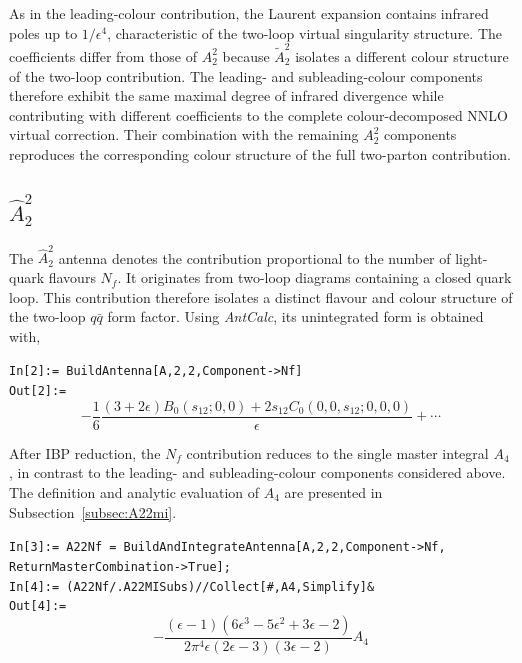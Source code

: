 As in the leading-colour contribution, the Laurent expansion contains infrared poles up to
$1/\epsilon^4$, characteristic of the two-loop virtual singularity structure. The coefficients differ
from those of $A_2^2$ because $\tilde A_2^2$ isolates a different colour structure of the two-loop
contribution. The leading- and subleading-colour components therefore exhibit the same maximal degree
of infrared divergence while contributing with different coefficients to the complete colour-decomposed
NNLO virtual correction. Their combination with the remaining $A_2^2$ components reproduces the
corresponding colour structure of the full two-parton contribution.

\subsection{$\hat A_2^2$}

The $\hat A_2^2$ antenna denotes the contribution proportional to the number of light-quark flavours
$N_f$. It originates from two-loop diagrams containing a closed quark loop.
This contribution therefore isolates a distinct flavour and colour structure of the two-loop $q\bar q$
form factor. Using \textit{AntCalc}, its unintegrated form is obtained with,

\begin{mdframed}[backgroundcolor=gray!10, linewidth=0pt]
\texttt{In[2]:= BuildAntenna[A,2,2,Component->Nf]}\\
\hfill
\texttt{Out[2]:=}
    \begin{equation*}
        -\frac16\frac{(3+2\epsilon)B_0\!\left(s_{12};0,0\right)+2s_{12}C_0\!\left(0,0,s_{12};0,0,0\right)}{\epsilon}+\cdots
    \end{equation*}
\end{mdframed}

After IBP reduction, the $N_f$ contribution reduces to the single master integral $A_4$, in contrast
to the leading- and subleading-colour components considered above. The definition and analytic
evaluation of $A_4$ are presented in Subsection~\ref{subsec:A22mi}.

\begin{mdframed}[backgroundcolor=gray!10, linewidth=0pt]
\texttt{In[3]:= A22Nf = BuildAndIntegrateAntenna[A,2,2,Component->Nf,\\ReturnMasterCombination->True];}\\
\texttt{In[4]:= (A22Nf/.A22MISubs)//Collect[\#,A4,Simplify]\&}\\
\hfill
\texttt{Out[4]:=}
    \begin{equation*}
        -\frac{(\epsilon-1)\left(6\epsilon^3-5\epsilon^2+3\epsilon-2\right)}{2\pi^4\epsilon(2\epsilon-3)(3\epsilon-2)}A_4
    \end{equation*}
\end{mdframed}

